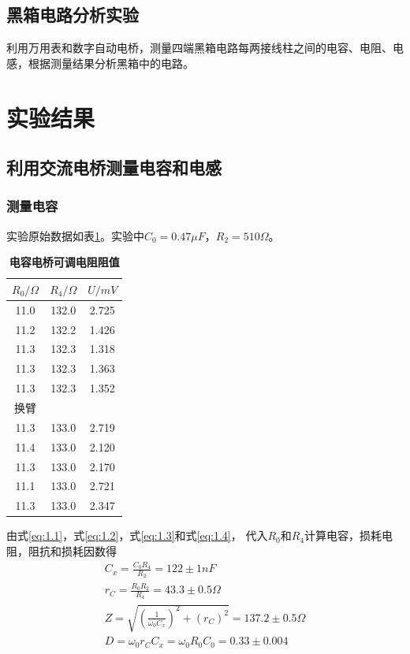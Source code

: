 \documentclass[10pt,a4paper,twocolumn,twoside,UTF8]{ctexart}
\begin{document}
	\subsection{黑箱电路分析实验}
	利用万用表和数字自动电桥，测量四端黑箱电路每两接线柱之间的电容、电阻、电感，根据测量结果分析黑箱中的电路。

\section{实验结果}
	\subsection{利用交流电桥测量电容和电感}
		\subsubsection{测量电容}
		实验原始数据如表\ref{tab:1.1}。实验中$C_0=0.47 \mu F$，$R_2 = 510 \Omega$。
			\begin{table}[htbp]
				\centering
					\begin{tabular}{ccc}
						\toprule
						$R_0 / \Omega$	&$R_4 / \Omega$	&$U /mV$ \\
						\midrule
						11.0	&132.0	&2.725	\\
						11.2	&132.2	&1.426	\\
						11.3	&132.3	&1.318	\\
						11.3	&132.3	&1.363	\\
						11.3	&132.3	&1.352	\\
						\midrule
						换臂 & & \\
						\midrule
						11.3	&133.0	&2.719	\\
						11.4	&133.0	&2.120	\\
						11.3	&133.0	&2.170	\\
						11.1	&133.0	&2.721	\\
						11.3	&133.0	&2.347	\\	
						\bottomrule
					\end{tabular}
					\caption{\textbf{电容电桥可调电阻阻值}}
					\label{tab:1.1}
			\end{table}

		由式\ref{eq:1.1}，式\ref{eq:1.2}，式\ref{eq:1.3}和式\ref{eq:1.4}，
		代入$R_0$和$R_4$计算电容，损耗电阻，阻抗和损耗因数得
			\begin{gather}
				C_x = \frac{C_0R_4}{R_2} = 122 \pm 1 nF  \\
				r_C = \frac{R_0R_2}{R_4} = 43.3 \pm 0.5 \Omega \\
				Z = \sqrt{(\frac{1}{\omega_0 C_x})^2+(r_C)^2} = 137.2 \pm 0.5 \Omega \\
				D = \omega_0r_CC_x = \omega_0R_0C_0 =  0.33 \pm 0.004 
			\end{gather}
\end{document}
